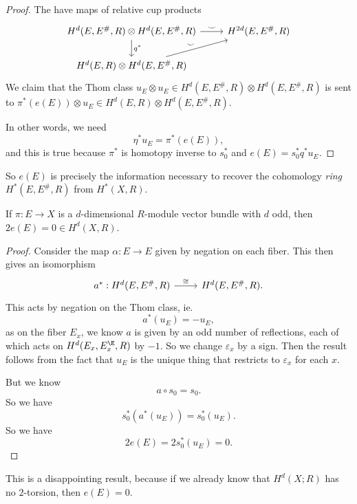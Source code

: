 \documentclass[a4paper]{article}
\begin{document}
\begin{proof}
  The have maps of relative cup products
  \[
    \begin{tikzcd}
      H^d(E, E^\#, R) \otimes H^d(E, E^\#, R) \ar[r, "\smile"] \ar[d, "q^*"] & H^{2d}(E, E^\#, R)\\
      H^d(E, R) \otimes H^d(E, E^\#, R) \ar[ur, "\smile"]
    \end{tikzcd}
  \]
  We claim that the Thom class $u_E \otimes u_E \in H^d(E, E^\#, R) \otimes H^d(E, E^\#, R)$ is sent to $\pi^*(e(E)) \otimes u_E \in H^d(E, R) \otimes H^d(E, E^\#, R)$.

  In other words, we need
  \[
    \eta^* u_E = \pi^*(e(E)),
  \]
  and this is true because $\pi^*$ is homotopy inverse to $s_0^*$ and $e(E) = s_0^* q^* u_E$.
\end{proof}
So $e(E)$ is precisely the information necessary to recover the cohomology \emph{ring} $H^*(E, E^\#, R)$ from $H^*(X, R)$.

\begin{lemma}
  If $\pi: E \to X$ is a $d$-dimensional $R$-module vector bundle with $d$ odd, then $2e(E) = 0 \in H^d(X, R)$.
\end{lemma}

\begin{proof}
  Consider the map $\alpha: E \to E$ given by negation on each fiber. This then gives an isomorphism
  \[
    \begin{tikzcd}
      a^*: H^d(E, E^\#, R) \ar[r, "\cong"] & H^d(E, E^\#, R).
    \end{tikzcd}
  \]
  This acts by negation on the Thom class, ie.
  \[
    a^*(u_E) = - u_E,
  \]
  as on the fiber $E_x$, we know $a$ is given by an odd number of reflections, each of which acts on $H^d(E_x, E_x^\E, R)$ by $-1$. So we change $\varepsilon_x$ by a sign. Then the result follows from the fact that $u_E$ is the unique thing that restricts to $\varepsilon_x$ for each $x$.

  But we know
  \[
    a \circ s_0 = s_0.
  \]
  So we have
  \[
    s_0^*(a^*(u_E)) = s_0^*(u_E).
  \]
  So we have
  \[
    2 e(E) = 2 s_0^*(u_E) = 0.
  \]
\end{proof}
This is a disappointing result, because if we already know that $H^d(X; R)$ has no $2$-torsion, then $e(E) = 0$.
\end{document}

